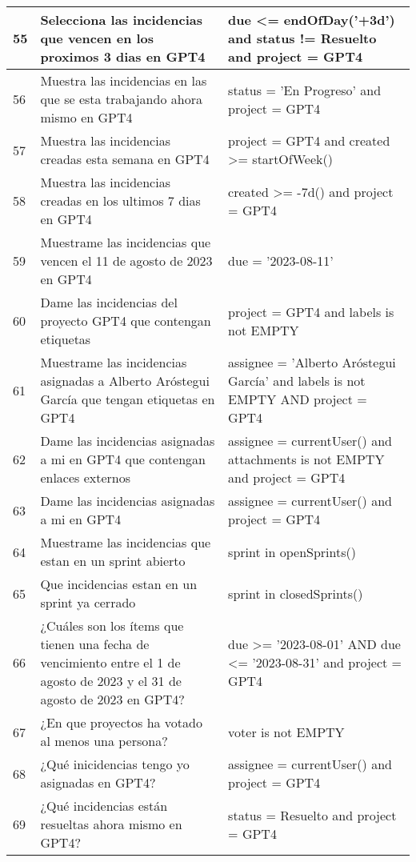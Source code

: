\begin{center}
\begin{longtable}{ | p{1cm} | p{8cm} | p{6cm} | }
        \hline
        55 & Selecciona las incidencias que vencen en los proximos 3 dias en GPT4 & due <= endOfDay('+3d') and status != Resuelto and project = GPT4 \\
        \hline
        56 & Muestra las incidencias en las que se esta trabajando ahora mismo en GPT4 & status = 'En Progreso' and project = GPT4 \\
        \hline
        57 & Muestra las incidencias creadas esta semana en GPT4 & project = GPT4 and created >= startOfWeek() \\
        \hline
        58 & Muestra las incidencias creadas en los ultimos 7 dias en GPT4 & created >= -7d() and project = GPT4 \\
        \hline
        59 & Muestrame las incidencias que vencen el 11 de agosto de 2023 en GPT4 & due = '2023-08-11' \\
        \hline
        60 & Dame las incidencias del proyecto GPT4 que contengan etiquetas & project = GPT4 and labels is not EMPTY \\
        \hline
        61 & Muestrame las incidencias asignadas a Alberto Aróstegui García que tengan etiquetas en GPT4 & assignee = 'Alberto Aróstegui García' and labels is not EMPTY AND project = GPT4 \\
        \hline
        62 & Dame las incidencias asignadas a mi en GPT4 que contengan enlaces externos & assignee = currentUser() and attachments is not EMPTY and project = GPT4 \\
        \hline
        63 & Dame las incidencias asignadas a mi en GPT4 & assignee = currentUser() and project = GPT4 \\
        \hline
        64 & Muestrame las incidencias que estan en un sprint abierto & sprint in openSprints() \\
        \hline
        65 & Que incidencias estan en un sprint ya cerrado & sprint in closedSprints() \\
        \hline
        66 & ¿Cuáles son los ítems que tienen una fecha de vencimiento entre el 1 de agosto de 2023 y el 31 de agosto de 2023 en GPT4? & due >= '2023-08-01' AND due <= '2023-08-31' and project = GPT4 \\
        \hline
        67 & ¿En que proyectos ha votado al menos una persona? & voter is not EMPTY \\
        \hline
        68 & ¿Qué inicidencias tengo yo asignadas en GPT4? & assignee = currentUser() and project = GPT4 \\
        \hline
        69 & ¿Qué incidencias están resueltas ahora mismo en GPT4? & status = Resuelto and project = GPT4 \\

\end{longtable}
\end{center}
